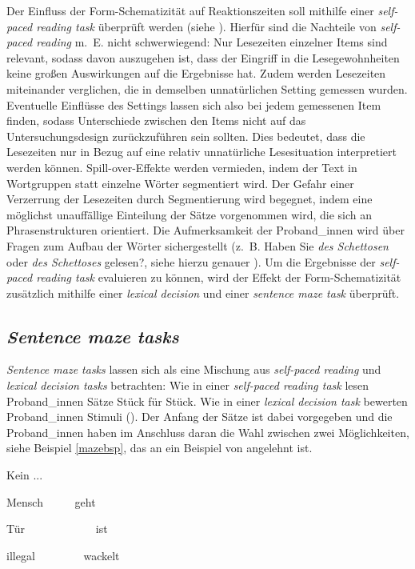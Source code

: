 Der Einfluss der  Form-Schematizität  auf Reaktionszeiten soll mithilfe einer \textit{self-paced reading task} überprüft werden (siehe ). Hierfür sind die Nachteile von \textit{self-paced reading} m.~E. nicht schwerwiegend: Nur Lesezeiten einzelner Items sind relevant, sodass davon auszugehen ist, dass der Eingriff in die Lesegewohnheiten keine großen Auswirkungen auf die Ergebnisse hat. Zudem werden Lesezeiten miteinander verglichen, die in demselben unnatürlichen Setting gemessen wurden. Eventuelle Einflüsse des Settings lassen sich also bei jedem gemessenen Item finden, sodass Unterschiede zwischen den Items nicht auf das Untersuchungsdesign zurückzuführen sein sollten. Dies bedeutet, dass die Lesezeiten nur in Bezug auf eine relativ unnatürliche Lesesituation interpretiert werden können. Spill-over-Effekte werden vermieden, indem der Text in Wortgruppen statt einzelne Wörter segmentiert wird. Der Gefahr einer Verzerrung der Lesezeiten durch Segmentierung wird begegnet, indem eine möglichst unauffällige Einteilung der Sätze vorgenommen wird, die sich an Phrasenstrukturen orientiert. Die Aufmerksamkeit der Proband\_innen wird über Fragen zum Aufbau der Wörter sichergestellt (z.~B. Haben Sie \textit{des Schettosen} oder \textit{des Schettoses} gelesen?, siehe hierzu genauer ). Um die Ergebnisse der \textit{self-paced reading task} evaluieren zu können, wird der Effekt der  Form-Schematizität  zusätzlich mithilfe einer \textit{lexical decision} und einer \textit{sentence maze task} überprüft.

\subsection{\textit{Sentence maze tasks}}
\label{sentmazetask}

\textit{Sentence maze tasks} lassen sich als eine Mischung aus \textit{self-paced reading} und \textit{lexical decision tasks} betrachten: Wie in einer \textit{self-paced reading task} lesen Proband\_innen Sätze Stück für Stück. Wie in einer \textit{lexical decision task} bewerten Proband\_innen Stimuli (\cite[347]{Forster.2010}).  Der Anfang der Sätze ist dabei vorgegeben und die Proband\_innen haben im Anschluss daran die Wahl zwischen zwei Möglichkeiten, siehe Beispiel \ref{mazebsp}, das an ein Beispiel von \textcite[163--164]{Forster.2009} angelehnt ist. 

\begin{exe}

\item Kein ... \label{mazebsp}
\begin{xlist}
\item Mensch	\ \ \ \ \ geht
\item Tür \ \ \ \ \ \ \ \ \ \ \ \ ist
\item illegal \ \ \ \ \ \ \ \ wackelt
\end{xlist}
\end{exe}

